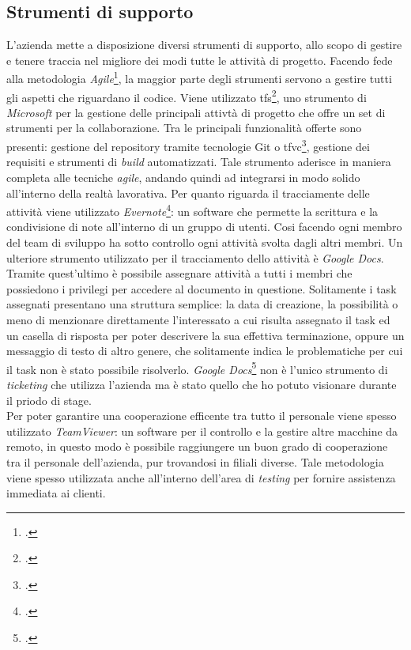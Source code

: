 \subsection{Strumenti di supporto }
L'azienda mette a disposizione diversi strumenti di supporto, allo scopo di gestire e tenere traccia nel migliore dei modi tutte le attività di progetto.
Facendo fede alla metodologia \textit{Agile}\footcite{Agile: https://it.wikipedia.org/wiki/Metodologia_agile}, la maggior parte degli strumenti servono a gestire tutti gli aspetti che riguardano il codice. Viene utilizzato \gls{tfs}\footcite{TFS: https://en.wikipedia.org/wiki/Azure_DevOps_Server}, uno strumento di \textit{Microsoft} per la gestione delle principali attivtà di progetto che offre un set di strumenti per la collaborazione. Tra le principali funzionalità offerte sono presenti: gestione del repository tramite tecnologie Git o \gls{tfvc}\footcite{TFVC: https://docs.microsoft.com/it-it/visualstudio/mac/tf-version-control?view=vsmac-2019}, gestione dei requisiti e strumenti di \textit{build} automatizzati. Tale strumento aderisce in maniera completa alle tecniche \textit{agile}, andando quindi ad integrarsi in modo solido all'interno della realtà lavorativa. Per quanto riguarda il tracciamente delle attività viene utilizzato \textit{Evernote}\footcite{Evernote: https://evernote.com/}: un software che permette la scrittura e la condivisione di note all'interno di un gruppo di utenti. Cosi facendo ogni membro del team di sviluppo ha sotto controllo ogni attività svolta dagli altri membri. Un ulteriore strumento utilizzato per il tracciamento dello attività è \textit{Google Docs}. Tramite quest'ultimo è possibile assegnare attività a tutti i membri che possiedono i privilegi per accedere al documento in questione. Solitamente i task assegnati presentano una struttura semplice: la data di creazione, la possibilità o meno di menzionare direttamente l'interessato a cui risulta assegnato il task ed un casella di risposta per poter descrivere la sua effettiva terminazione, oppure un messaggio di testo di altro genere, che solitamente indica le problematiche per cui il task non è stato possibile risolverlo. \textit{Google Docs}\footcite{Google Docs: https://docs.google.com/} non è l'unico strumento di \textit{ticketing} che utilizza l'azienda ma è stato quello che ho potuto visionare durante il priodo di stage.\\
Per poter garantire una cooperazione efficente tra tutto il personale viene spesso utilizzato \textit{TeamViewer}: un software per il controllo e la gestire altre macchine da remoto, in questo modo è possibile raggiungere un buon grado di cooperazione tra il personale dell'azienda, pur trovandosi in filiali diverse. Tale metodologia viene spesso utilizzata anche all'interno dell'area di \textit{testing} per fornire assistenza immediata ai clienti.
